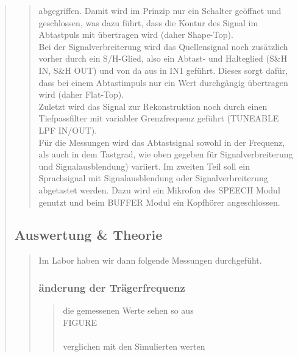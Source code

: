 \begin{quote}
\begin{quote}
        abgegriffen. Damit wird im Prinzip nur ein Schalter geöffnet und geschlossen, was dazu führt, dass die Kontur
        des Signal im Abtastpuls mit übertragen wird (daher Shape-Top).\\
        Bei der Signalverbreiterung wird das Quellensignal noch zusätzlich vorher durch ein S/H-Glied, also ein Abtast-
        und Halteglied (S\&H IN, S\&H OUT) und von da aus in IN1 geführt. Dieses sorgt dafür, dass bei einem
        Abtastimpuls nur ein Wert durchgängig übertragen wird (daher Flat-Top).\\
        \noindent\hspace*{4mm}
        Zuletzt wird das Signal zur Rekonstruktion noch durch einen Tiefpassfilter mit variabler Grenzfrequenz geführt
        (TUNEABLE LPF IN/OUT).\\
        \noindent\hspace*{4mm}
        Für die Messungen wird das Abtastsignal sowohl in der Frequenz, als auch in dem Tastgrad, wie oben gegeben für
        Signalverbreiterung und Signalausblendung) variiert.
        Im zweiten Teil soll ein Sprachsignal mit Signalausblendung oder Signalverbreiterung abgetastet werden. Dazu
        wird ein Mikrofon des SPEECH Modul genutzt und beim BUFFER Modul ein Kopfhörer angeschlossen.
    \end{quote}
    
    
    \subsection{Auswertung \& Theorie}
    \begin{quote}
        
        Im Labor haben wir dann folgende Messungen durchgefüht.
        
        
        \subsubsection{änderung der Trägerfrequenz}
        \begin{quote}
            
            die gemessenen Werte sehen so aus\\
            
            FIGURE\\
            \\
            
            
            verglichen mit den Simulierten werten\\
            

\end{quote}
\end{quote}
\end{quote}
